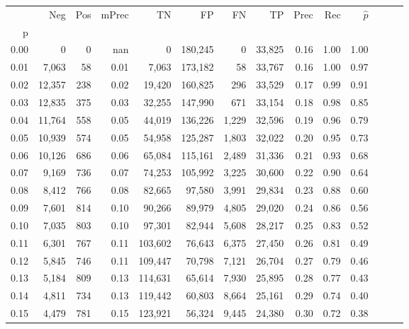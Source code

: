 \begin{tabular}{rrrrrrrrrrrrrr}
\toprule
{} &     Neg &  Pos & mPrec &       TN &       FP &      FN &      TP &  Prec &   Rec & $\hat{p}$ \\
p    &         &      &       &          &          &         &         &       &       &           \\
\midrule
0.00 &       0 &    0 &   nan &        0 &  180,245 &       0 &  33,825 &  0.16 &  1.00 &      1.00 \\
0.01 &   7,063 &   58 &  0.01 &    7,063 &  173,182 &      58 &  33,767 &  0.16 &  1.00 &      0.97 \\
0.02 &  12,357 &  238 &  0.02 &   19,420 &  160,825 &     296 &  33,529 &  0.17 &  0.99 &      0.91 \\
0.03 &  12,835 &  375 &  0.03 &   32,255 &  147,990 &     671 &  33,154 &  0.18 &  0.98 &      0.85 \\
0.04 &  11,764 &  558 &  0.05 &   44,019 &  136,226 &   1,229 &  32,596 &  0.19 &  0.96 &      0.79 \\
0.05 &  10,939 &  574 &  0.05 &   54,958 &  125,287 &   1,803 &  32,022 &  0.20 &  0.95 &      0.73 \\
0.06 &  10,126 &  686 &  0.06 &   65,084 &  115,161 &   2,489 &  31,336 &  0.21 &  0.93 &      0.68 \\
0.07 &   9,169 &  736 &  0.07 &   74,253 &  105,992 &   3,225 &  30,600 &  0.22 &  0.90 &      0.64 \\
0.08 &   8,412 &  766 &  0.08 &   82,665 &   97,580 &   3,991 &  29,834 &  0.23 &  0.88 &      0.60 \\
0.09 &   7,601 &  814 &  0.10 &   90,266 &   89,979 &   4,805 &  29,020 &  0.24 &  0.86 &      0.56 \\
0.10 &   7,035 &  803 &  0.10 &   97,301 &   82,944 &   5,608 &  28,217 &  0.25 &  0.83 &      0.52 \\
0.11 &   6,301 &  767 &  0.11 &  103,602 &   76,643 &   6,375 &  27,450 &  0.26 &  0.81 &      0.49 \\
0.12 &   5,845 &  746 &  0.11 &  109,447 &   70,798 &   7,121 &  26,704 &  0.27 &  0.79 &      0.46 \\
0.13 &   5,184 &  809 &  0.13 &  114,631 &   65,614 &   7,930 &  25,895 &  0.28 &  0.77 &      0.43 \\
0.14 &   4,811 &  734 &  0.13 &  119,442 &   60,803 &   8,664 &  25,161 &  0.29 &  0.74 &      0.40 \\
0.15 &   4,479 &  781 &  0.15 &  123,921 &   56,324 &   9,445 &  24,380 &  0.30 &  0.72 &      0.38 \\

\end{tabular}
